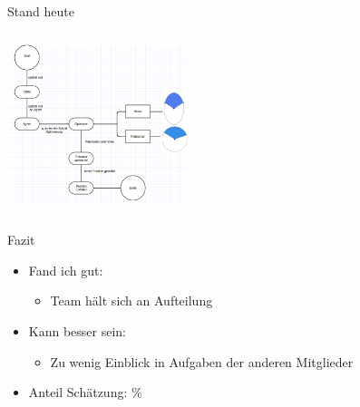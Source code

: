 \begin{frame}{Stand heute}
	\begin{center}
		\includegraphics[width=200px, height=200px, keepaspectratio]{appendix/images/struct_new.png}		
	\end{center}	
\end{frame}


\begin{frame}{Fazit}
	\begin{itemize}
		\item Fand ich gut:
			\begin{itemize}
				\item Team hält sich an Aufteilung
			\end{itemize}

		\item Kann besser sein:
			\begin{itemize}
				\item Zu wenig Einblick in Aufgaben der anderen Mitglieder
			\end{itemize}
		\item Anteil Schätzung: \%
	\end{itemize}
\end{frame}